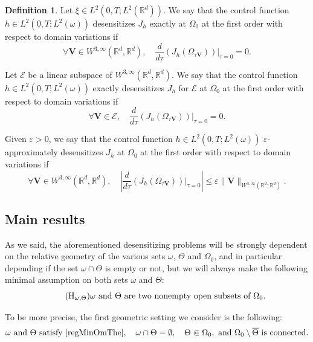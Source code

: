 \documentclass[10pt,a4paper]{amsart}
\newcommand{\bV}{\boldsymbol{V}}
\newcommand\R{{\mathbb R}}
\newcommand{\Hreg}{\mathrm{H}_{\omega,\Theta}}
\theoremstyle{definition}
\newtheorem{definition}[theorem]{Definition}
\begin{document}
\begin{definition}
Let {$\xi \in L^2(0,T; L^2(\R^d))$}.
We say that the control function $h \in L^2(0,T; L^2(\omega))$ desensitizes $J_h$ exactly at $\Omega_0$ at the first order with respect to domain variations if
\begin{equation}
\label{Exact-Insentitizing}
\forall\bV\in W^{3,\infty}(\R^d, \R^d),
\quad
\dfrac{d }{d \tau}\left(J_h \left(\Omega_{\tau\bV} \right)\right)\Big|_{\tau=0}=0.
\end{equation}

Let $\mathcal{E}$ be a linear subspace of $W^{3,\infty}(\R^d, \R^d)$.
We say that the control function $h \in L^2(0,T; L^2(\omega))$ exactly desensitizes $J_h$ for $\mathcal{E}$ at $\Omega_0$ at the first order with respect to domain variations if
\begin{equation}
\label{Finite-Insensitizing}
\forall\bV\in \mathcal{E},
\quad
\dfrac{d }{d \tau}\left(J_h \left(\Omega_{\tau\bV} \right)\right)\Big|_{\tau=0}=0.
\end{equation}

Given $\varepsilon>0$, we say that the control function $h \in L^2(0,T; L^2(\omega))$ $\varepsilon$-approximately desensitizes $J_h$ at $\Omega_0$ at the first order with respect to domain variations if
\begin{equation}
\label{Approx-Insensitizing}
\forall\bV\in W^{3,\infty}(\R^d, \R^d),
\quad
\left|\dfrac{d }{d \tau}\left(J_h\left(\Omega_{\tau \bV}\right)\right)\Big|_{\tau=0}\right |\leq \varepsilon \| \bV \|_{W^{3, \infty}(\R^d; \R^d)}.
\end{equation}
\end{definition}

\subsection{Main results}
As we said, the aforementioned desensitizing problems will be strongly dependent on the relative geometry of the various sets $\omega$, $\Theta$ and $\Omega_0$, and in particular depending if the set $\omega \cap \Theta$ is empty or not{, but we will always make the following minimal assumption} on both sets $\omega$ and $\Theta$:
\begin{equation}\tag{$\Hreg$}\label{regMinOmThe}
\text{$\omega$ and $\Theta$ are two nonempty open subsets of $\Omega_0$.}
\end{equation}

To be more precise, the first geometric setting we consider is the following:
\begin{equation}
\label{Case-1-emptyset}
\omega\text{ and }\Theta\text{ satisfy }\eqref{regMinOmThe},\quad
\omega \cap \Theta = \emptyset,
\quad \Theta \Subset \Omega_0,
\text{ and } \Omega_0 \setminus \overline\Theta \text{ is connected}.
\end{equation}
\end{document}
